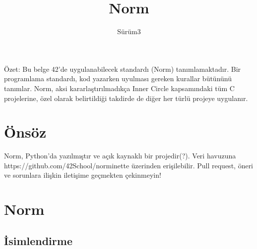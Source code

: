 \documentclass{42-en}
\begin{document}
\title{Norm}
\subtitle{Sürüm3}

\summary
{
    Özet: Bu belge 42’de uygulanabilecek standardı (Norm) tanımlamaktadır.
    Bir programlama standardı, kod yazarken uyulması gereken kurallar bütününü
    tanımlar. Norm, aksi kararlaştırılmadıkça Inner Circle kapsamındaki
    tüm C projelerine, özel olarak belirtildiği takdirde de diğer her türlü
    projeye uygulanır.
}

\maketitle

\tableofcontents



\chapter{Önsöz}

    Norm, Python’da yazılmıştır ve açık kaynaklı bir projedir(?).
    Veri havuzuna https://github.com/42School/norminette üzerinden erişilebilir.
    Pull request, öneri ve sorunlara ilişkin iletişime geçmekten çekinmeyin!

\chapter{Norm}


    \section{İsimlendirme}
\end{document}

